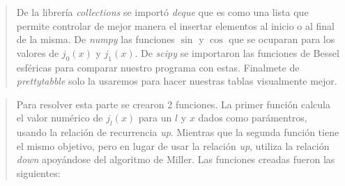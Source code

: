 \documentclass[9pt]{article}
\begin{document}
    \begin{quote}
De la librería \emph{collections} se importó \emph{deque} que es como
una lista que permite controlar de mejor manera el insertar elementos al
inicio o al final de la misma. De \emph{numpy} las funciones \(\sin\) y
\(\cos\) que se ocuparan para los valores de \(j_0(x)\) y \(j_1(x)\). De
\emph{scipy} se importaron las funciones de Bessel esféricas para
comparar nuestro programa con estas. Finalmete de \emph{prettytabble}
solo la usaremos para hacer nuestras tablas visualmente mejor.
\end{quote}

\begin{quote}
Para resolver esta parte se crearon 2 funciones. La primer función
calcula el valor numérico de \(j_l(x)\) para un \(l\) y \(x\) dados como
parámentros, usando la relación de recurrencia \emph{up}. Mientras que
la segunda función tiene el mismo objetivo, pero en lugar de usar la
relación \emph{up}, utiliza la relación \emph{down} apoyándose del
algoritmo de Miller. Las funciones creadas fueron las siguientes:
\end{quote}
\end{document}
